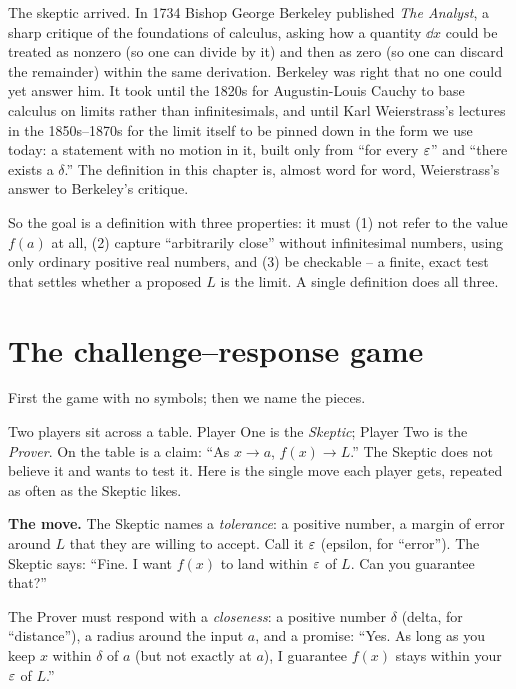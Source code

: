 \begin{historybox}
The skeptic arrived. In 1734 Bishop George Berkeley published \emph{The Analyst},
a sharp critique of the foundations of calculus, asking how a quantity $\dd x$
could be treated as nonzero (so one can divide by it) and then as zero (so one
can discard the remainder) within the same derivation. Berkeley was right
that no one could yet answer him. It took until the 1820s
for Augustin-Louis Cauchy to base calculus on limits rather than infinitesimals,
and until Karl Weierstrass's lectures in the 1850s--1870s for the limit itself
to be pinned down in the form we use today: a statement with no motion in it,
built only from ``for every $\varepsilon$'' and ``there exists a $\delta$.'' The definition in this chapter is, almost word for word,
Weierstrass's answer to Berkeley's critique.
\end{historybox}

So the goal is a definition with three properties: it must (1) not refer to the
value $f(a)$ at all, (2) capture ``arbitrarily close'' without infinitesimal
numbers, using only ordinary positive real numbers, and (3) be
checkable -- a finite, exact test that settles whether a proposed $L$ is
the limit. A single definition does all three.

\section{The challenge--response game}
\label{ch06:game}

First the game with no symbols; then we name the pieces.

Two players sit across a table. Player One is the \emph{Skeptic}; Player Two is
the \emph{Prover}. On the table is a claim: ``As $x \to a$, $f(x) \to L$.'' The
Skeptic does not believe it and wants to test it. Here is the single move each
player gets, repeated as often as the Skeptic likes.

\begin{focusbox}
\textbf{The move.} The Skeptic names a \emph{tolerance}: a positive number, a
margin of error around $L$ that they are willing to accept. Call it $\varepsilon$
(epsilon, for ``error''). The Skeptic says: ``Fine. I want $f(x)$ to land
within $\varepsilon$ of $L$. Can you guarantee that?''

The Prover must respond with a \emph{closeness}: a positive number $\delta$
(delta, for ``distance''), a radius around the input $a$, and a promise: ``Yes.
As long as you keep $x$ within $\delta$ of $a$ (but not exactly at $a$), I
guarantee $f(x)$ stays within your $\varepsilon$ of $L$.''
\end{focusbox}

